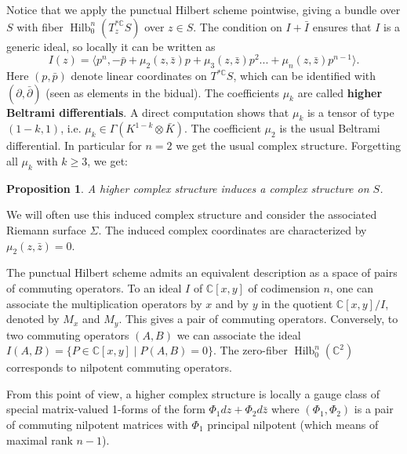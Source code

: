 \documentclass[11pt]{amsart}
\newtheorem{prop}[thm]{Proposition}
\numberwithin{thm}{section} %
\numberwithin{equation}{section} %
\numberwithin{figure}{section} %
\newcommand*{\C}{\mathbb{C}}
\DeclareMathOperator{\Hilb}{Hilb}
\begin{document}
Notice that we apply the punctual Hilbert scheme pointwise, giving a  bundle over $S$ with fiber $\Hilb^n_0(T_z^{*\C}S)$ over $z\in S$.
The condition on $I+\bar{I}$ ensures that $I$ is a generic ideal, so locally it can be written as
\begin{equation}\label{I-expr}
I(z)=\langle p^n, -\bar{p}+\mu_2(z, \bar{z})p+\mu_3(z, \bar{z}) p^2...+\mu_n(z, \bar{z})p^{n-1}\rangle.
\end{equation}
Here $(p,\bar{p})$ denote linear coordinates on $T^{*\C}S$, which can be identified with $(\partial,\bar\partial)$ (seen as elements in the bidual). The coefficients $\mu_k$ are called \textbf{higher Beltrami differentials}. A direct computation shows that $\mu_k$ is a tensor of type $(1-k,1)$, i.e. $\mu_k \in \Gamma(K^{1-k}\otimes \bar{K})$. The coefficient $\mu_2$ is the usual Beltrami differential. In particular for $n=2$ we get the usual complex structure. Forgetting all $\mu_k$ with $k\geq 3$, we get:
\begin{prop}
A higher complex structure induces a complex structure on $S$.
\end{prop}
We will often use this induced complex structure and consider the associated Riemann surface $\Sigma$. The induced complex coordinates are characterized by $\mu_2(z,\bar{z})=0$.

The punctual Hilbert scheme admits an equivalent description as a space of pairs of commuting operators. To an ideal $I$ of $\C[x,y]$ of codimension $n$, one can associate the multiplication operators by $x$ and by $y$ in the quotient $\C[x,y]/I$, denoted by $M_x$ and $M_y$. This gives a pair of commuting operators. Conversely, to two commuting operators $(A,B)$ we can associate the ideal $I(A,B)=\{P\in\C[x,y] \mid P(A,B)=0\}$. 
The zero-fiber $\Hilb^n_0(\C^2)$ corresponds to nilpotent commuting operators.

From this point of view, a higher complex structure is locally a gauge class of special matrix-valued 1-forms of the form $\Phi_1dz+\Phi_2d\bar{z}$ where $(\Phi_1, \Phi_2)$ is a pair of commuting nilpotent matrices with $\Phi_1$ principal nilpotent (which means of maximal rank $n-1$).
\end{document}
